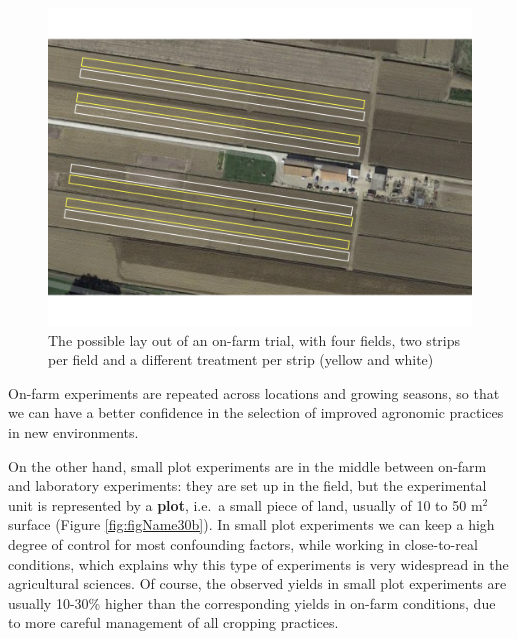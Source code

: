 \documentclass[a4paper,12pt,oneside]{book}
\begin{document}
\begin{figure}

{\centering \includegraphics[width=0.9\linewidth]{_images/OnFarmTrial} 

}

\caption{The possible lay out of an on-farm trial, with four fields, two strips per field and a different treatment per strip (yellow and white)}\label{fig:figName30a}
\end{figure}

On-farm experiments are repeated across locations and growing seasons, so that we can have a better confidence in the selection of improved agronomic practices in new environments.

On the other hand, small plot experiments are in the middle between on-farm and laboratory experiments: they are set up in the field, but the experimental unit is represented by a \textbf{plot}, i.e.~a small piece of land, usually of 10 to 50 m\(^2\) surface (Figure \ref{fig:figName30b}). In small plot experiments we can keep a high degree of control for most confounding factors, while working in close-to-real conditions, which explains why this type of experiments is very widespread in the agricultural sciences. Of course, the observed yields in small plot experiments are usually 10-30\% higher than the corresponding yields in on-farm conditions, due to more careful management of all cropping practices.
\end{document}
